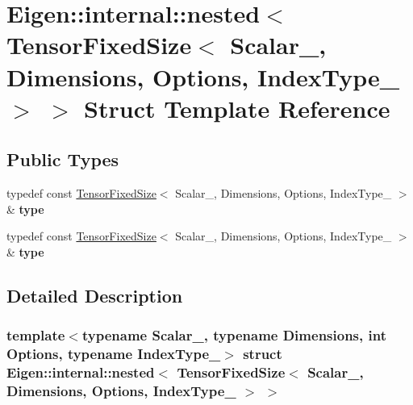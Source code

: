 \hypertarget{struct_eigen_1_1internal_1_1nested_3_01_tensor_fixed_size_3_01_scalar___00_01_dimensions_00_01_o3bfcf7dc4c1a033b438e61c7069c6497}{}\section{Eigen\+:\+:internal\+:\+:nested$<$ Tensor\+Fixed\+Size$<$ Scalar\+\_\+, Dimensions, Options, Index\+Type\+\_\+ $>$ $>$ Struct Template Reference}
\label{struct_eigen_1_1internal_1_1nested_3_01_tensor_fixed_size_3_01_scalar___00_01_dimensions_00_01_o3bfcf7dc4c1a033b438e61c7069c6497}
\subsection*{Public Types}
\begin{DoxyCompactItemize}
\item 
\mbox{\label{struct_eigen_1_1internal_1_1nested_3_01_tensor_fixed_size_3_01_scalar___00_01_dimensions_00_01_o3bfcf7dc4c1a033b438e61c7069c6497_af11a03e5443be8fdd676d9abc9e6a2fe}} 
typedef const \hyperlink{class_eigen_1_1_tensor_fixed_size}{Tensor\+Fixed\+Size}$<$ Scalar\+\_\+, Dimensions, Options, Index\+Type\+\_\+ $>$ \& {\bfseries type}
\item 
\mbox{\label{struct_eigen_1_1internal_1_1nested_3_01_tensor_fixed_size_3_01_scalar___00_01_dimensions_00_01_o3bfcf7dc4c1a033b438e61c7069c6497_af11a03e5443be8fdd676d9abc9e6a2fe}} 
typedef const \hyperlink{class_eigen_1_1_tensor_fixed_size}{Tensor\+Fixed\+Size}$<$ Scalar\+\_\+, Dimensions, Options, Index\+Type\+\_\+ $>$ \& {\bfseries type}
\end{DoxyCompactItemize}


\subsection{Detailed Description}
\subsubsection*{template$<$typename Scalar\+\_\+, typename Dimensions, int Options, typename Index\+Type\+\_\+$>$\newline
struct Eigen\+::internal\+::nested$<$ Tensor\+Fixed\+Size$<$ Scalar\+\_\+, Dimensions, Options, Index\+Type\+\_\+ $>$ $>$}



